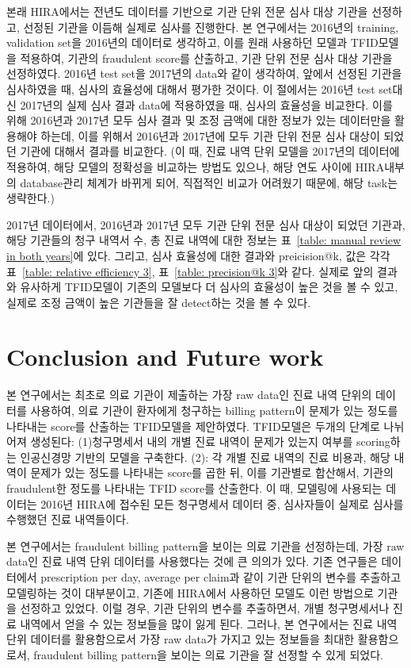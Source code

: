 \documentclass[11pt]{article}           %
\begin{document}
본래 HIRA에서는 전년도 데이터를 기반으로 기관 단위 전문 심사 대상 기관을 선정하고, 선정된 기관을 이듬해 실제로 심사를 진행한다.
본 연구에서는 2016년의 training, validation set을 2016년의 데이터로 생각하고, 이를 원래 사용하던 모델과 TFID모델을 적용하여, 기관의 fraudulent score를 산출하고, 기관 단위 전문 심사 대상 기관을 선정하였다.
2016년 test set을 2017년의 data와 같이 생각하여, 앞에서 선정된 기관을 심사하였을 때, 심사의 효율성에 대해서 평가한 것이다.
이 절에서는 2016년 test set대신 2017년의 실제 심사 결과 data에 적용하였을 때, 심사의 효율성을 비교한다.
이를 위해 2016년과 2017년 모두 심사 결과 및 조정 금액에 대한 정보가 있는 데이터만을 활용해야 하는데, 이를 위해서 2016년과 2017년에 모두 기관 단위 전문 심사 대상이 되었던 기관에 대해서 결과를 비교한다.
(이 때, 진료 내역 단위 모델을 2017년의 데이터에 적용하여, 해당 모델의 정확성을 비교하는 방법도 있으나, 해당 연도 사이에 HIRA내부의 database관리 체계가 바뀌게 되어, 직접적인 비교가 어려웠기 때문에, 해당 task는 생략한다.)

2017년 데이터에서, 2016년과 2017년 모두 기관 단위 전문 심사 대상이 되었던 기관과, 해당 기관들의 청구 내역서 수, 총 진료 내역에 대한 정보는 표~\ref{table: manual review in both years}에 있다. 그리고, 심사 효율성에 대한 결과와 preicision@k, 값은 각각 표~\ref{table: relative efficiency 3}, 표~\ref{table: precision@k 3}와 같다. 실제로 앞의 결과와 유사하게 TFID모델이 기존의 모델보다 더 심사의 효율성이 높은 것을 볼 수 있고, 실제로 조정 금액이 높은 기관들을 잘 detect하는 것을 볼 수 있다.

\section{Conclusion and Future work}
\label{6}
본 연구에서는 최초로 의료 기관이 제출하는 가장 raw data인 진료 내역 단위의 데이터를 사용하여, 의료 기관이 환자에게 청구하는 billing pattern이 문제가 있는 정도를 나타내는 score를 산출하는 TFID모델을 제안하였다.
TFID모델은 두개의 단계로 나뉘어져 생성된다: (1)청구명세서 내의 개별 진료 내역이 문제가 있는지 여부를 scoring하는 인공신경망 기반의 모델을 구축한다.
(2): 각 개별 진료 내역의 진료 비용과, 해당 내역이 문제가 있는 정도를 나타내는 score를 곱한 뒤, 이를 기관별로 합산해서, 기관의 fraudulent한 정도를 나타내는 TFID score를 산출한다.
이 때, 모델링에 사용되는 데이터는 2016년 HIRA에 접수된 모든 청구명세서 데이터 중, 심사자들이 실제로 심사를 수행했던 진료 내역들이다. 

본 연구에서는 fraudulent billing pattern을 보이는 의료 기관을 선정하는데, 가장 raw data인 진료 내역 단위 데이터를 사용했다는 것에 큰 의의가 있다.
기존 연구들은 데이터에서 prescription per day, average per claim과 같이 기관 단위의 변수를 추출하고 모델링하는 것이 대부분이고, 기존에 HIRA에서 사용하던 모델도 이런 방법으로 기관을 선정하고 있었다.
이럴 경우, 기관 단위의 변수를 추출하면서, 개별 청구명세서나 진료 내역에서 얻을 수 있는 정보들을 많이 잃게 된다.
그러나, 본 연구에서는 진료 내역 단위 데이터를 활용함으로서 가장 raw data가 가지고 있는 정보들을 최대한 활용함으로서, fraudulent billing pattern을 보이는 의료 기관을 잘 선정할 수 있게 되었다.
\end{document}
